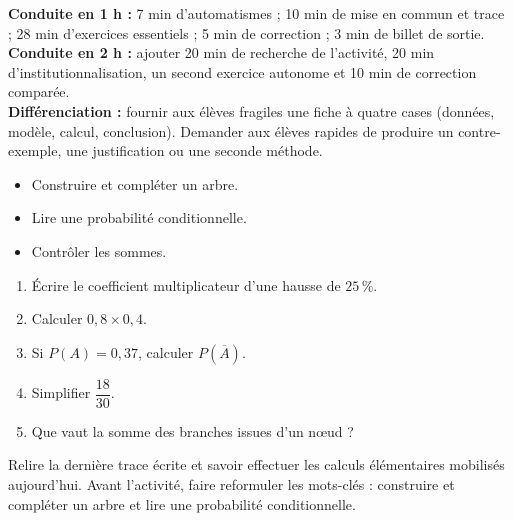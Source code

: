 \ifprof
\begin{methode}
\textbf{Conduite en 1 h :} 7 min d'automatismes ; 10 min de mise en commun et trace ; 28 min d'exercices essentiels ; 5 min de correction ; 3 min de billet de sortie.\\
\textbf{Conduite en 2 h :} ajouter 20 min de recherche de l'activité, 20 min d'institutionnalisation, un second exercice autonome et 10 min de correction comparée.\\
\textbf{Différenciation :} fournir aux élèves fragiles une fiche à quatre cases (données, modèle, calcul, conclusion). Demander aux élèves rapides de produire un contre-exemple, une justification ou une seconde méthode.
\end{methode}
\fi
{}
    \begin{objectifs}\begin{itemize}\item Construire et compléter un arbre.\item Lire une probabilité conditionnelle.\item Contrôler les sommes.\end{itemize}\end{objectifs}
    \begin{automatismes}\begin{enumerate}\item Écrire le coefficient multiplicateur d'une hausse de $25\,\%$. \item Calculer $0{,}8\times0{,}4$. \item Si $P(A)=0{,}37$, calculer $P(\overline A)$. \item Simplifier $\dfrac{18}{30}$. \item Que vaut la somme des branches issues d'un nœud ? \end{enumerate}\end{automatismes}
    \begin{prerequis}Relire la dernière trace écrite et savoir effectuer les calculs élémentaires mobilisés aujourd'hui. Avant l'activité, faire reformuler les mots-clés : construire et compléter un arbre et lire une probabilité conditionnelle.\end{prerequis}

